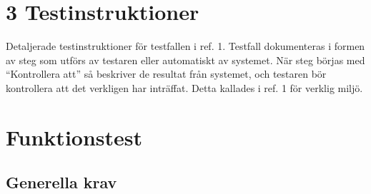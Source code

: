 \documentclass[a4paper]{article}
\begin{document}
\section{3 Testinstruktioner}
Detaljerade testinstruktioner för testfallen i ref. 1. Testfall dokumenteras i formen av steg som utförs av testaren eller automatiskt av systemet. När steg börjas med ``Kontrollera att'' så beskriver de resultat från systemet, och testaren bör kontrollera att det verkligen har inträffat. Detta kallades i ref. 1 för verklig miljö.

\section{Funktionstest}


%
%
%

\subsection{Generella krav}
\end{document}
